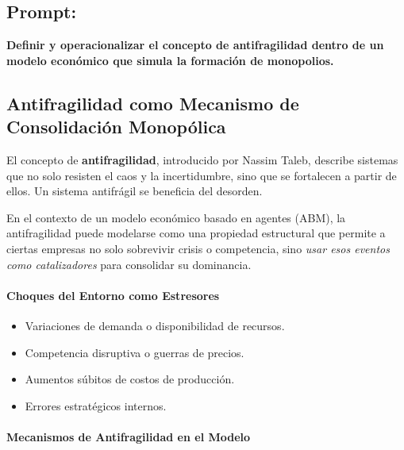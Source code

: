 \documentclass[a4paper,12pt]{article}
\begin{document}
\subsection*{Prompt:}
\textbf{Definir y operacionalizar el concepto de antifragilidad dentro de un modelo económico que simula la formación de monopolios.}

\subsection*{Antifragilidad como Mecanismo de Consolidación Monopólica}

El concepto de \textbf{antifragilidad}, introducido por Nassim Taleb, describe sistemas que no solo resisten el caos y la incertidumbre, sino que se fortalecen a partir de ellos. Un sistema antifrágil se beneficia del desorden.

En el contexto de un modelo económico basado en agentes (ABM), la antifragilidad puede modelarse como una propiedad estructural que permite a ciertas empresas no solo sobrevivir crisis o competencia, sino \textit{usar esos eventos como catalizadores} para consolidar su dominancia.

\paragraph{Choques del Entorno como Estresores}
\begin{itemize}
    \item Variaciones de demanda o disponibilidad de recursos.
    \item Competencia disruptiva o guerras de precios.
    \item Aumentos súbitos de costos de producción.
    \item Errores estratégicos internos.
\end{itemize}

\paragraph{Mecanismos de Antifragilidad en el Modelo}
\end{document}
